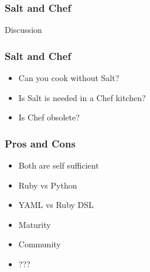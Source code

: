 \frame
{
  \frametitle{Salt and Chef}
  \begin{center}
    Discussion
  \end{center}
}

\frame
{
  \frametitle{Salt and Chef}
  \begin{itemize}
    \item<1-> Can you cook without Salt?
    \item<2-> Is Salt is needed in a Chef kitchen?
    \item<3-> Is Chef obsolete?
  \end{itemize}
}

\frame
{
  \frametitle{Pros and Cons}
  \begin{itemize}
    \item<1-> Both are self sufficient
    \item<2-> Ruby vs Python
    \item<3-> YAML vs Ruby DSL
    \item<4-> Maturity
    \item<5-> Community
    \item<6-> ???
  \end{itemize}
}
